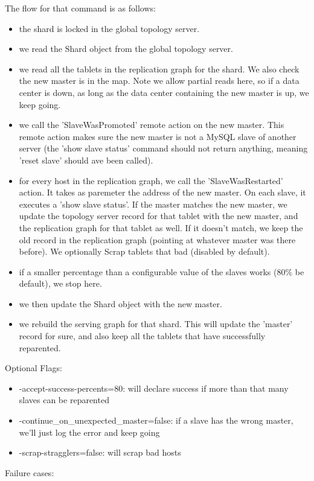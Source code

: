 The flow for that command is as follows:
\begin{itemize}
\item  the shard is locked in the global topology server.
\item  we read the Shard object from the global topology server.
\item  we read all the tablets in the replication graph for the shard. We also check the new master is in the map. Note we allow partial reads here, so if a data center is down, as long as the data center containing the new master is up, we keep going.
\item  we call the 'SlaveWasPromoted' remote action on the new master. This remote action makes sure the new master is not a MySQL slave of another server (the 'show slave status' command should not return anything, meaning 'reset slave' should ave been called).
\item  for every host in the replication graph, we call the 'SlaveWasRestarted' action. It takes as paremeter the address of the new master. On each slave, it executes a 'show slave status'. If the master matches the new master, we update the topology server record for that tablet with the new master, and the replication graph for that tablet as well. If it doesn't match, we keep the old record in the replication graph (pointing at whatever master was there before). We optionally Scrap tablets that bad (disabled by default).
\item  if a smaller percentage than a configurable value of the slaves works (80\% be default), we stop here.
\item  we then update the Shard object with the new master.
\item  we rebuild the serving graph for that shard. This will update the 'master' record for sure, and also keep all the tablets that have successfully reparented.
\end{itemize}

Optional Flags:
\begin{itemize}
\item  -accept-success-percents=80: will declare success if more than that many slaves can be reparented
\item  -continue\_on\_unexpected\_master=false: if a slave has the wrong master, we'll just log the error and keep going
\item  -scrap-stragglers=false: will scrap bad hosts
\end{itemize}

Failure cases:

